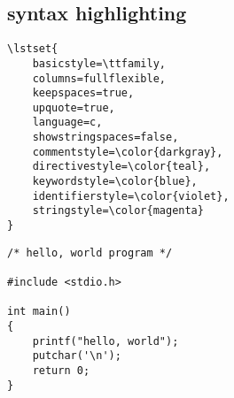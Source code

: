 \documentclass{article}
\begin{document}
\subsection{syntax highlighting}
{
\begin{lstlisting}
\lstset{
    basicstyle=\ttfamily,
    columns=fullflexible,
    keepspaces=true,
    upquote=true,
    language=c,
    showstringspaces=false,
    commentstyle=\color{darkgray},
    directivestyle=\color{teal},
    keywordstyle=\color{blue},
    identifierstyle=\color{violet},
    stringstyle=\color{magenta}
}
\end{lstlisting}
}
{
\begin{lstlisting}
/* hello, world program */

#include <stdio.h>

int main()
{
    printf("hello, world");
    putchar('\n');
    return 0;
}
\end{lstlisting}
}
\end{document}
